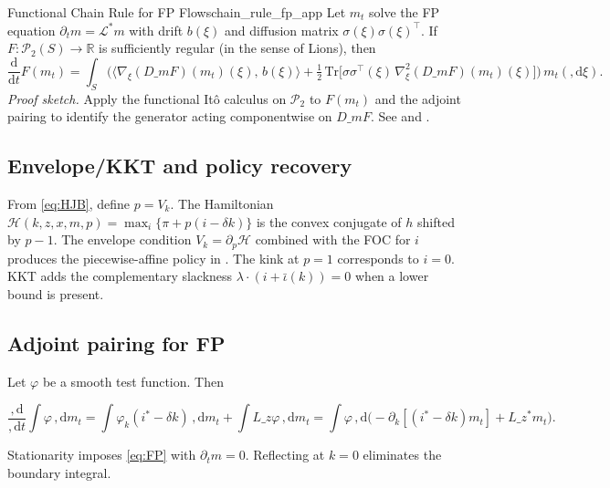 ﻿\documentclass[11pt,letterpaper,oneside]{article}
\numberwithin{equation}{section}
\newcommand{\R}{\mathbb{R}}
\newcommand{\1}{\mathbf{1}}
\newcommand{\diff}{,\mathrm{d}}
\newcommand{\Lz}{L\_z}
\newcommand{\Lzadj}{L\_z^{\!*}}
\newcommand{\Dm}{D\_m}
\newcommand{\kbar}{\bar\iota}
\begin{document}
\begin{lemma}{Functional Chain Rule for FP Flows}{chain_rule_fp_app}
Let $m_t$ solve the FP equation $\partial_t m = \mathcal L^{\!*} m$ with drift $b(\xi)$ and diffusion matrix $\sigma(\xi)\sigma(\xi)^\top$. If $F:\mathcal P_2(S)\to\R$ is sufficiently regular (in the sense of Lions), then
\[
\frac{\mathrm d}{\mathrm dt} F(m_t) 
= \int_S \Big( \langle \nabla_\xi (\Dm F)(m_t)(\xi),\, b(\xi) \rangle 
  + \tfrac12 \, \mathrm{Tr}\big[\sigma\sigma^\top(\xi)\, \nabla^2_\xi (\Dm F)(m_t)(\xi)\big] \Big) \, m_t(\diff \xi).
\]
\emph{Proof sketch.} Apply the functional It\^o calculus on $\mathcal P_2$ to $F(m_t)$ and the adjoint pairing to identify the generator acting componentwise on $\Dm F$. See \cite[Ch.~5]{carmona_delarue_2018_mfg} and \cite{cardaliaguet_delarue_lasry_lions_2019}.
\end{lemma}

\subsection{Envelope/KKT and policy recovery}
From \eqref{eq:HJB}, define $p=V_k$. The Hamiltonian
$\mathcal{H}(k,z,x,m,p)=\max_i\{\pi+p(i-\delta k)\}$
is the convex conjugate of $h$ shifted by $p-1$. The envelope condition $V_k=\partial_p \mathcal{H}$ combined with the FOC for $i$ produces the piecewise-affine policy in . The kink at $p=1$ corresponds to $i=0$. KKT adds the complementary slackness $\lambda\cdot(i+\kbar(k))=0$ when a lower bound is present.

\subsection{Adjoint pairing for FP}
Let $\varphi$ be a smooth test function. Then

$$
\frac{\diff}{\diff t}\int \varphi\,\diff m_t
= \int \varphi_k (i^*-\delta k)\,\diff m_t + \int \Lz \varphi\,\diff m_t
= \int \varphi\,\diff\Big(-\partial_k[(i^*-\delta k)m_t]+\Lzadj m_t\Big).
$$

Stationarity imposes \eqref{eq:FP} with $\partial_t m=0$. Reflecting at $k=0$ eliminates the boundary integral.
\end{document}
